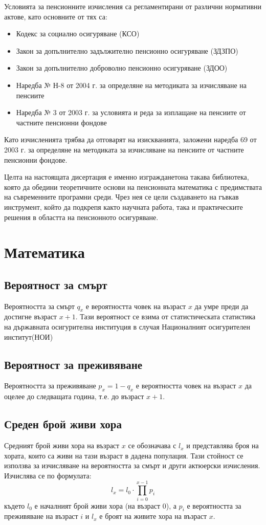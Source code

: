 \documentclass[a4paper,12pt]{article}
\begin{document}
Условията за пенсионните изчисления са регламентирани от различни нормативни актове, като основните от тях са:
\begin{itemize}
        \item Кодекс за социално осигуряване (КСО)
        \item Закон за допълнително задължително пенсионно осигуряване (ЗДЗПО)
        \item Закон за допълнително доброволно пенсионно осигуряване (ЗДОО)
        \item Наредба № Н-8 от 2004 г. за определяне на методиката за изчисляване на пенсиите
        \item Наредба № 3 от 2003 г. за условията и реда за изплащане на пенсиите от частните пенсионни фондове
\end{itemize}
Като изчисленията трябва да отговарят на изискванията, заложени наредба 69 от 2003 г. за определяне на методиката за изчисляване на пенсиите от частните пенсионни фондове. \cite{ZDZPO_2004,ZDOO_2000,DKFN_Pensions,NOI_Official}

Целта на настоящата дисертация е именно изгражданетона такава библиотека, която да обедини теоретичните основи на пенсионната математика с предимствата на съвременните програмни среди. Чрез нея се цели създаването на гъвкав инструмент, който да подкрепя както научната работа, така и практическите решения в областта на пенсионното осигуряване.
\newpage
\section{Математика}
\subsection{Вероятност за смърт}
Вероятността за смърт $q_x$ е вероятността човек на възраст $x$ да умре преди да достигне възраст $x+1$. Тази вероятност се взима от статистическата статистика на държавната осигурителна институция  в случая Националният осигурителен институт(НОИ)
\subsection{Вероятност за преживяване}
Вероятността за преживяване $p_x= 1-q_x$ е вероятността човек на възраст $x$ да оцелее до следващата година, т.е. до възраст $x+1$.
\subsection{Среден брой живи хора}
Средният брой живи хора на възраст $x$ се обозначава с $l_x$ и представлява броя на хората, които са живи на тази възраст в дадена популация. Тази стойност се използва за изчисляване на вероятността за смърт и други актюерски изчисления. Изчислява се по формулата:
\[l_{x} = l_0 \cdot \prod_{i=0}^{x-1} p_i\]
където $l_0$ е началният брой живи хора (на възраст 0), а $p_i$ е вероятността за преживяване на възраст $i$ и $l_x$ е броят на живите хора на възраст $x$.
\end{document}
